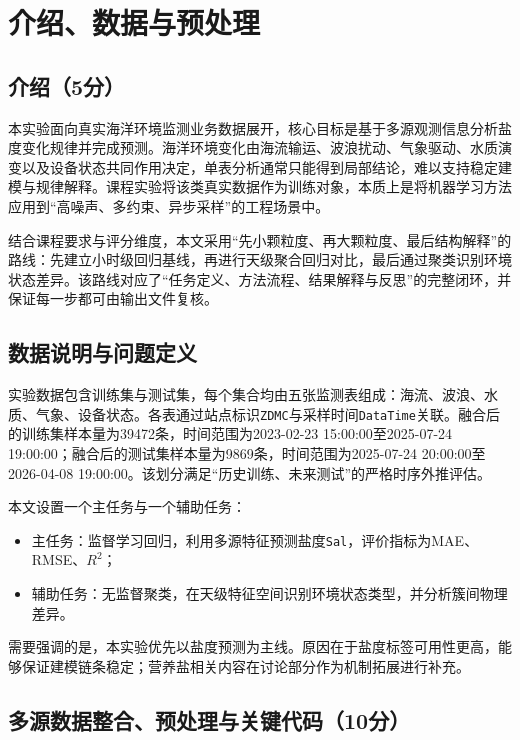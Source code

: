 ﻿\chapter{介绍、数据与预处理}

\section{介绍（5分）}

本实验面向真实海洋环境监测业务数据展开，核心目标是基于多源观测信息分析盐度变化规律并完成预测。海洋环境变化由海流输运、波浪扰动、气象驱动、水质演变以及设备状态共同作用决定，单表分析通常只能得到局部结论，难以支持稳定建模与规律解释。课程实验将该类真实数据作为训练对象，本质上是将机器学习方法应用到“高噪声、多约束、异步采样”的工程场景中\cite{zhou_ml_2016,course_ppt_2026}。

结合课程要求与评分维度，本文采用“先小颗粒度、再大颗粒度、最后结构解释”的路线：先建立小时级回归基线，再进行天级聚合回归对比，最后通过聚类识别环境状态差异。该路线对应了“任务定义、方法流程、结果解释与反思”的完整闭环，并保证每一步都可由输出文件复核。

\section{数据说明与问题定义}

实验数据包含训练集与测试集，每个集合均由五张监测表组成：海流、波浪、水质、气象、设备状态。各表通过站点标识\texttt{ZDMC}与采样时间\texttt{DataTime}关联。融合后的训练集样本量为39472条，时间范围为2023-02-23 15:00:00至2025-07-24 19:00:00；融合后的测试集样本量为9869条，时间范围为2025-07-24 20:00:00至2026-04-08 19:00:00。该划分满足“历史训练、未来测试”的严格时序外推评估。

本文设置一个主任务与一个辅助任务：
\begin{itemize}
    \item 主任务：监督学习回归，利用多源特征预测盐度\texttt{Sal}，评价指标为MAE、RMSE、$R^2$；
    \item 辅助任务：无监督聚类，在天级特征空间识别环境状态类型，并分析簇间物理差异。
\end{itemize}

需要强调的是，本实验优先以盐度预测为主线。原因在于盐度标签可用性更高，能够保证建模链条稳定；营养盐相关内容在讨论部分作为机制拓展进行补充。

\section{多源数据整合、预处理与关键代码（10分）}

